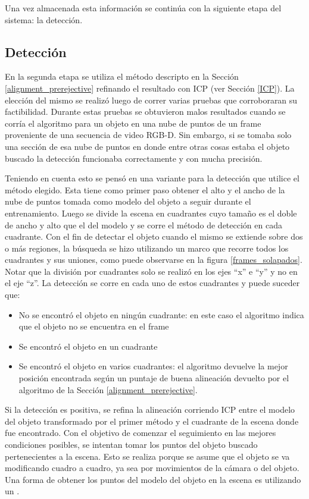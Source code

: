 Una vez almacenada esta información se continúa con la siguiente etapa del sistema: la detección.

\subsection{Detección}\label{deteccion_d}
En la segunda etapa se utiliza el método descripto en la Sección \ref{alignment_prerejective} refinando el resultado con ICP (ver Sección \ref{ICP}). La elección del mismo se realizó luego de correr varias pruebas que corroboraran su factibilidad. Durante estas pruebas se obtuvieron malos resultados cuando se corría el algoritmo para un objeto en una nube de puntos de un frame proveniente de una secuencia de video RGB-D. Sin embargo, si se tomaba solo una sección de esa nube de puntos en donde entre otras cosas estaba el objeto buscado la detección funcionaba correctamente y con mucha precisión.

Teniendo en cuenta esto se pensó en una variante para la detección que utilice el método elegido. Esta tiene como primer paso obtener el alto y el ancho de la nube de puntos tomada como modelo del objeto a seguir durante el entrenamiento. Luego se divide la escena en cuadrantes cuyo tamaño es el doble de ancho y alto que el del modelo y se corre el método de detección en cada cuadrante. Con el fin de detectar el objeto cuando el mismo se extiende sobre dos o más regiones, la búsqueda se hizo utilizando un marco que recorre todos los cuadrantes y sus uniones, como puede observarse en la figura \ref{frames_solapados}. Notar que la división por cuadrantes solo se realizó en los ejes ``x'' e ``y'' y no en el eje ``z''. La detección se corre en cada uno de estos cuadrantes y puede suceder que:
\begin{itemize}
	\item No se encontró el objeto en ningún cuadrante: en este caso el algoritmo indica que el objeto no se encuentra en el frame
	\item Se encontró el objeto en un cuadrante
	\item Se encontró el objeto en varios cuadrantes: el algoritmo devuelve la mejor posición encontrada según un puntaje de buena alineación devuelto por el algoritmo de la Sección \ref{alignment_prerejective}.
\end{itemize}

Si la detección es positiva, se refina la alineación corriendo ICP entre el modelo del objeto transformado por el primer método y el cuadrante de la escena donde fue encontrado. Con el objetivo de comenzar el seguimiento en las mejores condiciones posibles, se intentan tomar los puntos del objeto buscado pertenecientes a la escena. Esto se realiza porque se asume que el objeto se va modificando cuadro a cuadro, ya sea por movimientos de la cámara o del objeto. Una forma de obtener los puntos del modelo del objeto en la escena es utilizando un \kdt.


